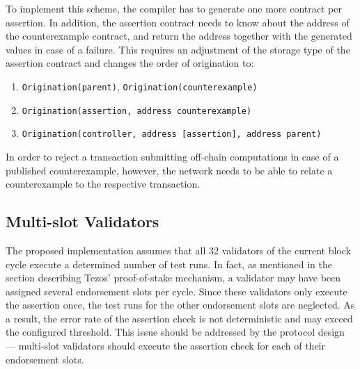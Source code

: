 To implement this scheme, the compiler has to generate one more contract per assertion. In addition, the assertion contract needs to know about the address of the counterexample contract, and return the address together with the generated values in case of a failure. This requires an adjustment of the storage type of the assertion contract and changes the order of origination to:
\begin{enumerate}
\itemsep-0.5em
\item \texttt{Origination(parent)}, \texttt{Origination(counterexample)}
\item \texttt{Origination(assertion, address counterexample)}
\item \texttt{Origination(controller, address [assertion], address parent)} 
\end{enumerate}

In order to reject a transaction submitting off-chain computations in case of a published counterexample, however, the network needs to be able to relate a counterexample to the respective transaction.  

\subsection{Multi-slot Validators}
The proposed implementation assumes that all 32 validators of the current block cycle execute a determined number of test runs. In fact, as mentioned in the section describing Tezos' proof-of-stake mechanism, a validator may have been assigned several endorsement slots per cycle. Since these validators only execute the assertion once, the test runs for the other endorsement slots are neglected. As a result, the error rate of the assertion check is not deterministic and may exceed the configured threshold. This issue should be addressed by the protocol design --- multi-slot validators should execute the assertion check for each of their endorsement slots.